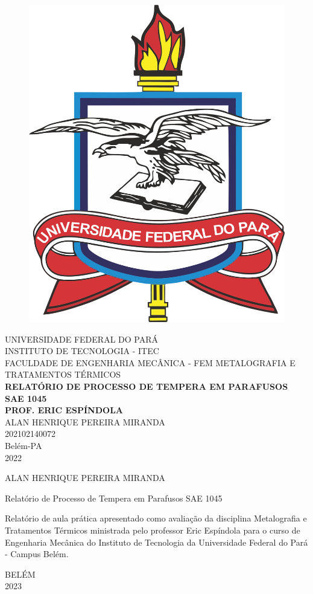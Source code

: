 \thispagestyle{empty}

\begin{center}
	\begin{figure}[h]
		\centering
		\includegraphics[width=0.2\linewidth]{imagens/ufpa}
		\label{fig:ufpa}
	\end{figure}
	
	
	\vspace{1cm}
	\large \uppercase{Universidade Federal do Pará}\\
	\large \uppercase{Instituto de Tecnologia - ITEC}\\
	\vspace{2.5cm}
	\large \uppercase{Faculdade de Engenharia Mecânica - FEM}
	\large \uppercase{Metalografia e Tratamentos Térmicos}\\
	\vspace{2.5cm}
	\large \textbf{\uppercase {Relatório de Processo de Tempera em Parafusos SAE 1045}} \\
	\large \textbf{\uppercase {PROF. Eric Espíndola}} \\
	\vspace{3.5cm}
	\large \uppercase {Alan Henrique Pereira Miranda}\\
	\large \uppercase {202102140072}\\
	\vspace{3.5cm}
	\large {Belém-PA \\ 2022}
	


\newpage
\setcounter{page}{1} %
\thispagestyle{empty}

ALAN HENRIQUE PEREIRA MIRANDA\\

\vspace{5cm}

Relatório de Processo de Tempera em Parafusos SAE 1045\\
\vspace{5cm}

\end{center}


\singlespacing
\hspace{8cm} %
\begin{minipage}{7cm}
\indent Relatório de aula prática apresentado como avaliação da disciplina Metalografia e Tratamentos Térmicos ministrada pelo professor Eric Espíndola para o curso de Engenharia Mecânica do Instituto de Tecnologia da Universidade Federal do Pará - Campus Belém. 
\end{minipage}
\vspace{7cm}

\onehalfspacing
\begin{center}
BELÉM\\
2023
\end{center}

\newpage
\thispagestyle{empty}
\begin{center}
\tableofcontents


\end{center}
